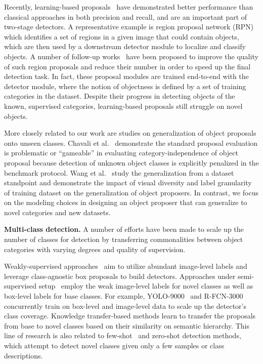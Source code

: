 \documentclass[10pt,twocolumn,letterpaper]{article}
\begin{document}
Recently, learning-based proposals~\cite{gidaris2016attend,kuo2015deepbox,li2019zoom, pinheiro2015learning,fasterNIPS2015} have demonstrated better performance than classical approaches in both precision and recall, and are an important part of two-stage detectors. A representative example is region proposal network (RPN)~\cite{fasterNIPS2015} which identifies a set of regions in a given image that could contain objects, which are then used by a downstream detector module to localize and classify objects. A number of follow-up works~\cite{gidaris2016attend,vu2019cascade,wang2019region,yang2016craft} have been proposed to improve the quality of such region proposals and reduce their number in order to speed up the final detection task. In fact, these proposal modules are trained end-to-end with the detector module, where the notion of objectness is defined by a set of training categories in the dataset. Despite their progress in detecting objects of the known, supervised categories, learning-based proposals still struggle on novel objects. 

More closely related to our work are studies on generalization of object proposals onto unseen classes. Chavali et al.~\cite{chavali2016object} demonstrate the standard proposal evaluation is problematic or ``gameable'' in evaluating category-independence of object proposal because detection of unknown object classes is explicitly penalized in the benchmark protocol. Wang et al.~\cite{wang2020leads} study the generalization from a dataset standpoint and demonstrate the impact of visual diversity and label granularity of training dataset on the generalization of object proposers. In contrast, we focus on the modeling choices in designing an object proposer that can generalize to novel categories and new datasets.

\vspace{1mm}
\noindent \textbf{Multi-class detection.} \quad
A number of efforts have been made to scale up the number of classes for detection by transferring commonalities between object categories with varying degrees and quality of supervision. 

Weakly-supervised approaches~\cite{arun2019dissimilarity,bilen2016weakly,diba2017weakly,tang2017multiple,wang2018collaborative} aim to utilize abundant image-level labels and leverage class-agnostic box proposals to build detectors. Approaches under semi-supervised setup~\cite{hoffman2014lsda,redmon2017yolo9000,singh2018r,singh2018dock,tang2016large,uijlings2018revisiting,yang2019detecting} employ the weak image-level labels for novel classes as well as box-level labels for base classes. For example, YOLO-9000~\cite{redmon2017yolo9000} and R-FCN-3000~\cite{singh2018r} concurrently train on box-level and image-level data to scale up the detector’s class coverage. Knowledge transfer-based methods learn to transfer the proposals from base to novel classes based on their similarity on semantic hierarchy. This line of research is also related to few-shot~\cite{chen2018lstd,kang2019few,wang2020frustratingly,wang2019meta,yan2019meta} and zero-shot detection\cite{bansal2018zero,frome2013devise,rahman2018zero,xian2018zero} methods, which attempt to detect novel classes given only a few samples or class descriptions.
\end{document}
